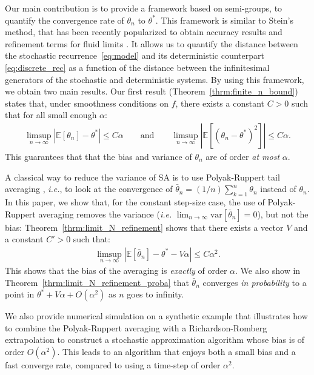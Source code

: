 \documentclass{article}
\newcommand\E{\mathbb{E}}
\newcommand\esp[1]{\E\left[#1\right]}
\newcommand\var[1]{\mathrm{var}\left[#1\right]}
\newcommand\abs[1]{\left|#1\right|}
\begin{document}
Our main contribution is to provide a framework based on semi-groups, to quantify the convergence rate of $\theta_n$ to $\theta^*$.  This framework is similar to Stein's method, that has been recently popularized to obtain accuracy results and refinement terms for fluid limits \cite{braverman2024high,gast2017expected,gast2017refined,ying2017stein}. It allows us to quantify the distance between the stochastic recurrence~\eqref{eq:model} and its deterministic counterpart \eqref{eq:discrete_rec} as a function of the distance between the infinitesimal generators of the stochastic and deterministic systems.  By using this framework, we obtain two main results.  Our first result (Theorem~\ref{thrm:finite_n_bound}) states that, under smoothness conditions on $f$, there exists a constant $C>0$ such that for all small enough $\alpha$:
\begin{align*}
    \limsup_{n\to\infty}|\esp{\theta_n} - \theta^* | \le C \alpha\qquad \mathrm{and}\qquad 
    \limsup_{n\to\infty}|\esp{(\theta_n- \theta^*)^2} | \le C \alpha.
\end{align*}
This guarantees that that the bias and variance of $\theta_n$ are of order \emph{at most} $\alpha$. 

A classical way to reduce the variance of SA is to use Polyak-Ruppert tail averaging \cite{polyak1992acceleration,ruppert1988efficient}, \emph{i.e.}, to look at the convergence of $\bar{\theta}_n=(1/n)\sum_{k=1}^n \theta_n$ instead of $\theta_n$. In this paper, we show that, for the constant step-size case, the use of Polyak-Ruppert averaging removes the variance (\emph{i.e.} $\lim_{n\to\infty}\var{\bar{\theta}_n}=0$), but not the bias: Theorem~\ref{thrm:limit_N_refinement} shows that there exists a vector $V$ and a constant $C'>0$ such that:
\begin{align*}
    \limsup_{n\to\infty}\abs{ \esp{\bar{\theta}_n} - \theta^* - V\alpha} \le C \alpha^2.
\end{align*}
This shows that the bias of the averaging is \emph{exactly} of order $\alpha$.  We also show in Theorem~\ref{thrm:limit_N_refinement_proba} that $\bar{\theta}_n$ converges \emph{in probability} to a point in $\theta^*+V\alpha+O(\alpha^2)$ as $n$ goes to infinity.

We also provide numerical simulation on a synthetic example that illustrates how to combine the Polyak-Ruppert averaging with a Richardson-Romberg extrapolation \cite{hildebrand1987introduction} to construct a stochastic approximation algorithm whose bias is of order $O(\alpha^2)$. 
This leads to an algorithm that enjoys both a small bias and a fast converge rate, compared to using a time-step of order $\alpha^2$. 
\end{document}
